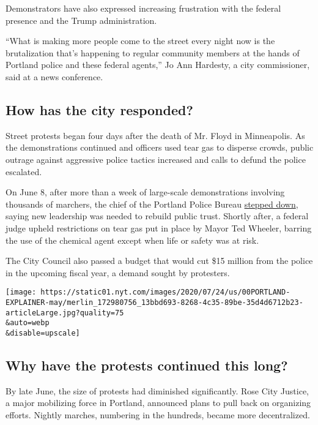 Demonstrators have also expressed increasing frustration with the
federal presence and the Trump administration.

``What is making more people come to the street every night now is the
brutalization that's happening to regular community members at the hands
of Portland police and these federal agents,'' Jo Ann Hardesty, a city
commissioner, said at a news conference.

\hypertarget{how-has-the-city-responded}{%
\subsection{How has the city
responded?}\label{how-has-the-city-responded}}

Street protests began four days after the death of Mr. Floyd in
Minneapolis. As the demonstrations continued and officers used tear gas
to disperse crowds, public outrage against aggressive police tactics
increased and calls to defund the police escalated.

On June 8, after more than a week of large-scale demonstrations
involving thousands of marchers, the chief of the Portland Police Bureau
\href{https://www.nytimes.com/2020/06/08/us/george-floyd-protests.html}{stepped
down}, saying new leadership was needed to rebuild public trust. Shortly
after, a federal judge upheld restrictions on tear gas put in place by
Mayor Ted Wheeler, barring the use of the chemical agent except when
life or safety was at risk.

The City Council also passed a budget that would cut \$15 million from
the police in the upcoming fiscal year, a demand sought by protesters.

\texttt{[image: https://static01.nyt.com/images/2020/07/24/us/00PORTLAND-EXPLAINER-may/merlin\_172980756\_13bbd693-8268-4c35-89be-35d4d6712b23-articleLarge.jpg?quality=75\\\&auto=webp\\\&disable=upscale]}

\hypertarget{why-have-the-protests-continued-this-long}{%
\subsection{Why have the protests continued this
long?}\label{why-have-the-protests-continued-this-long}}

By late June, the size of protests had diminished significantly. Rose
City Justice, a major mobilizing force in Portland, announced plans to
pull back on organizing efforts. Nightly marches, numbering in the
hundreds, became more decentralized.

